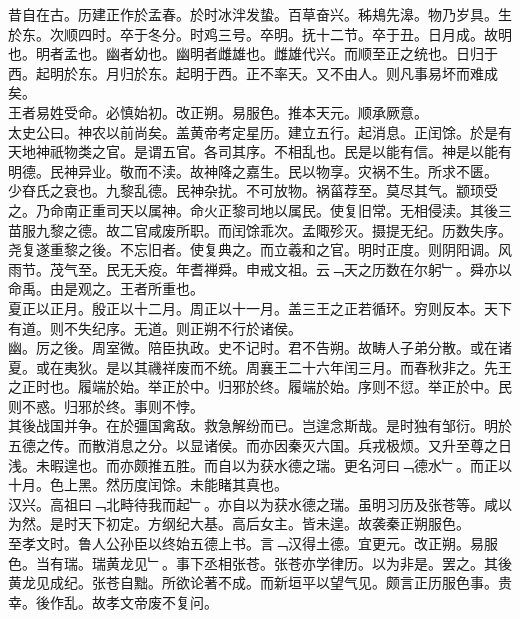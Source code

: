 \documentclass{zhvt-classic}
\begin{document}
\hspace*{2em}昔自在古。历建正作於孟春。於时冰泮发蛰。百草奋兴。秭鳺先滜。物乃岁具。生於东。次顺四时。卒于冬分。时鸡三号。卒明。抚十二节。卒于丑。日月成。故明也。明者孟也。幽者幼也。幽明者雌雄也。雌雄代兴。而顺至正之统也。日归于西。起明於东。月归於东。起明于西。正不率天。又不由人。则凡事易坏而难成矣。\\
\hspace*{2em}王者易姓受命。必慎始初。改正朔。易服色。推本天元。顺承厥意。\\
\hspace*{2em}太史公曰。神农以前尚矣。盖黄帝考定星历。建立五行。起消息。正闰馀。於是有天地神祇物类之官。是谓五官。各司其序。不相乱也。民是以能有信。神是以能有明德。民神异业。敬而不渎。故神降之嘉生。民以物享。灾祸不生。所求不匮。\\
\hspace*{2em}少昚氏之衰也。九黎乱德。民神杂扰。不可放物。祸菑荐至。莫尽其气。颛顼受之。乃命南正重司天以属神。命火正黎司地以属民。使复旧常。无相侵渎。其後三苗服九黎之德。故二官咸废所职。而闰馀乖次。孟陬殄灭。摄提无纪。历数失序。尧复遂重黎之後。不忘旧者。使复典之。而立羲和之官。明时正度。则阴阳调。风雨节。茂气至。民无夭疫。年耆禅舜。申戒文祖。云﹁天之历数在尔躬﹂。舜亦以命禹。由是观之。王者所重也。\\
\hspace*{2em}夏正以正月。殷正以十二月。周正以十一月。盖三王之正若循环。穷则反本。天下有道。则不失纪序。无道。则正朔不行於诸侯。\\
\hspace*{2em}幽。厉之後。周室微。陪臣执政。史不记时。君不告朔。故畴人子弟分散。或在诸夏。或在夷狄。是以其禨祥废而不统。周襄王二十六年闰三月。而春秋非之。先王之正时也。履端於始。举正於中。归邪於终。履端於始。序则不愆。举正於中。民则不惑。归邪於终。事则不悖。\\
\hspace*{2em}其後战国并争。在於彊国禽敌。救急解纷而已。岂遑念斯哉。是时独有邹衍。明於五德之传。而散消息之分。以显诸侯。而亦因秦灭六国。兵戎极烦。又升至尊之日浅。未暇遑也。而亦颇推五胜。而自以为获水德之瑞。更名河曰﹁德水﹂。而正以十月。色上黑。然历度闰馀。未能睹其真也。\\
\hspace*{2em}汉兴。高祖曰﹁北畤待我而起﹂。亦自以为获水德之瑞。虽明习历及张苍等。咸以为然。是时天下初定。方纲纪大基。高后女主。皆未遑。故袭秦正朔服色。\\
\hspace*{2em}至孝文时。鲁人公孙臣以终始五德上书。言﹁汉得土德。宜更元。改正朔。易服色。当有瑞。瑞黄龙见﹂。事下丞相张苍。张苍亦学律历。以为非是。罢之。其後黄龙见成纪。张苍自黜。所欲论著不成。而新垣平以望气见。颇言正历服色事。贵幸。後作乱。故孝文帝废不复问。\\
\end{document}
